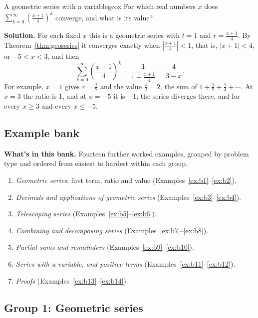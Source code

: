 \documentclass[11pt]{article}
\begin{document}
\begin{exmp}{A geometric series with a variable}{geox}
For which real numbers $x$ does $\displaystyle\sum_{k=0}^\infty\left(\frac{x+1}4\right)^k$ converge, and what is its value?

\textbf{Solution.} For each fixed $x$ this is a geometric series with $t=1$ and $r=\frac{x+1}4$. By Theorem~\ref{thm:geoseries} it converges exactly when $\left|\frac{x+1}4\right|<1$, that is, $|x+1|<4$, or $-5<x<3$, and then
\[
\sum_{k=0}^\infty\left(\frac{x+1}4\right)^k=\frac1{1-\frac{x+1}4}=\frac4{3-x}.
\]
For example, $x=1$ gives $r=\frac12$ and the value $\frac42=2$, the sum of $1+\frac12+\frac14+\cdots$. At $x=3$ the ratio is $1$, and at $x=-5$ it is $-1$; the series diverges there, and for every $x\ge3$ and every $x\le-5$.
\end{exmp}

\subsection*{Example bank}

\textbf{What's in this bank.} Fourteen further worked examples, grouped by problem type and ordered from easiest to hardest within each group.
\begin{enumerate}[nosep]
  \item \emph{Geometric series}: first term, ratio and value (Examples~\ref{ex:b1}--\ref{ex:b2}).
  \item \emph{Decimals and applications of geometric series} (Examples~\ref{ex:b3}--\ref{ex:b4}).
  \item \emph{Telescoping series} (Examples~\ref{ex:b5}--\ref{ex:b6}).
  \item \emph{Combining and decomposing series} (Examples~\ref{ex:b7}--\ref{ex:b8}).
  \item \emph{Partial sums and remainders} (Examples~\ref{ex:b9}--\ref{ex:b10}).
  \item \emph{Series with a variable, and positive terms} (Examples~\ref{ex:b11}--\ref{ex:b12}).
  \item \emph{Proofs} (Examples~\ref{ex:b13}--\ref{ex:b14}).
\end{enumerate}

\subsection*{Group 1: Geometric series}
\end{document}
